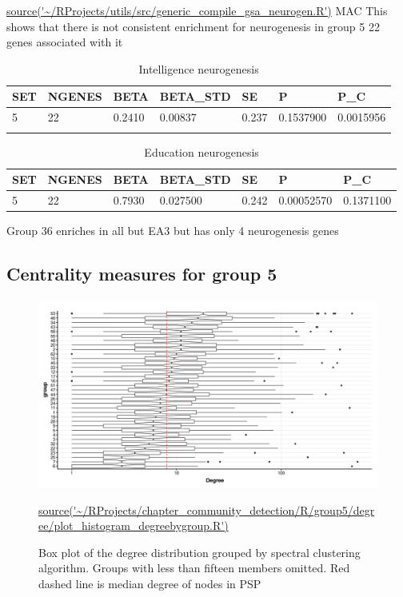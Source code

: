 \url{source('~/RProjects/utils/src/generic_compile_gsa_neurogen.R')} MAC
This shows that there is not consistent enrichment for neurogenesis in group 5 22 genes associated with it 
\begin{table}[]
    \centering
    \begin{tabular}{lllllll}
        SET& NGENES&    BETA &BETA\_STD  &  SE      &   P  & P\_C\\
        \hline
  5  &   22&  0.2410&  0.00837& 0.237& 0.1537900& 0.0015956\\   
         & 
    \end{tabular}
    \caption{Intelligence neurogenesis}
    \label{tab:Intelligence neurogenesis}
\end{table}

\begin{table}[]
    \centering
    \begin{tabular}{lllllll}
        SET& NGENES&    BETA &BETA\_STD  &  SE      &   P  & P\_C\\
        \hline
  5   &  22&  0.7930&  0.027500& 0.242& 0.00052570 &0.1371100\\

 \end{tabular}
    \caption{Education neurogenesis}
    \label{tab:Education neurogenesis}
\end{table}

Group 36 enriches in all but EA3 but has only 4 neurogenesis genes 





\subsection{Centrality measures for group 5}
\label{sec: centrality measures for group 5}

\begin{figure}
    \centering
    \includegraphics[width=\textwidth]{images/chaptercommunity/ggplot2/degreebygroup/Rplot_degree_theme_degree_label.png}
    \caption[Boxplot of degree grouped by spectral cluster]{Box plot of the degree distribution grouped by spectral clustering algorithm. Groups with less than fifteen members omitted. Red dashed line is median degree of nodes in PSP}
    \tiny\url{source('~/RProjects/chapter_community_detection/R/group5/degree/plot_histogram_degreebygroup.R')}
    \label{fig:my_label}
\end{figure}


